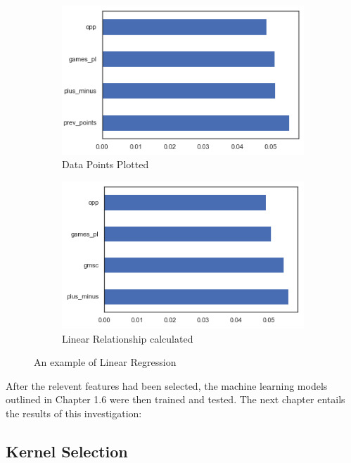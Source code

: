 \documentclass[a4paper,11pt,twoside]{article}
\begin{document}
\begin{figure} [h!]
  \centering
  \begin{subfigure}[b]{0.45\textwidth}
    \includegraphics[width=\textwidth]{etc1.png}
    \caption{Data Points Plotted}
    \label{fig:1}
  \end{subfigure}
  \begin{subfigure}[b]{0.45\textwidth}
    \includegraphics[width=\textwidth]{etc2.png}
    \caption{Linear Relationship calculated}
    \label{fig:2}
  \end{subfigure}
  \caption{An example of Linear Regression}
  \label{fig:3}
\end{figure}

After the relevent features had been selected, the machine learning models outlined in Chapter 1.6 were then trained and tested. The next chapter entails the results of this investigation: 

\subsection{Kernel Selection}
\end{document}
